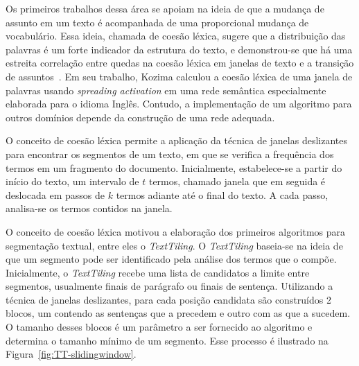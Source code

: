 


Os primeiros trabalhos dessa área se apoiam na ideia de que a mudança de assunto em um texto é acompanhada de uma proporcional mudança de vocabulário. Essa ideia, chamada de coesão léxica, sugere que a distribuição das palavras é um forte indicador da estrutura do texto, e demonstrou-se que há uma estreita correlação entre quedas na coesão léxica em janelas de texto e a transição de assuntos~\cite{Kozima1993}. Em seu trabalho, Kozima calculou a coesão léxica de uma janela de palavras usando \textit{spreading activation} em uma rede semântica especialmente elaborada para o idioma Inglês. Contudo, a implementação de um algoritmo para outros domínios depende da construção de uma rede adequada. 



O conceito de coesão léxica permite a aplicação da técnica de janelas deslizantes para encontrar os segmentos de um texto, em que se verifica a frequência dos termos em um fragmento do documento. Inicialmente, estabelece-se a partir do início do texto, um intervalo de $t$ termos, chamado janela que em seguida é deslocada em passos de $k$ termos adiante até o final do texto. A cada passo, analisa-se os termos contidos na janela.





O conceito de coesão léxica motivou a elaboração dos primeiros algoritmos para segmentação textual, entre eles o \textit{TextTiling}. O \textit{TextTiling} baseia-se na ideia de que um segmento pode ser identificado pela análise dos termos que o compõe. Inicialmente, o \textit{TextTiling} recebe uma lista de candidatos a limite entre segmentos, usualmente finais de parágrafo ou finais de sentença. Utilizando a técnica de janelas deslizantes, para cada posição candidata são construídos 2 blocos, um contendo as sentenças que a precedem e outro com as que a sucedem. O tamanho desses blocos é um parâmetro a ser fornecido ao algoritmo e determina o tamanho mínimo de um segmento. Esse processo é ilustrado na Figura~\ref{fig:TT-slidingwindow}.



